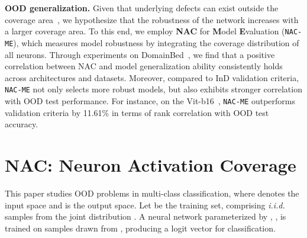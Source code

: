 \documentclass{article} \usepackage{iclr2024_conference,times}
\newcommand{\bfstart}[1]{\noindent\textbf{#1.}}
\begin{document}
\bfstart{OOD generalization} 
Given that underlying defects can exist outside the coverage area~\citep{NACT_System:DeepXplore}, we hypothesize that the robustness of the network increases with a larger coverage area.
To this end, we employ \textbf{NAC} for \textbf{M}odel \textbf{E}valuation (\texttt{NAC-ME}), which measures model robustness by integrating the coverage distribution of all neurons.
Through experiments on DomainBed~\citep{Setup:DomainBed}, we find that a positive correlation between NAC and model generalization ability consistently holds across architectures and datasets. 
Moreover, compared to InD validation criteria, \texttt{NAC-ME} not only selects more robust models, but also exhibits stronger correlation with OOD test performance.
For instance, on the Vit-b16~\citep{tech:ViT}, \texttt{NAC-ME} outperforms validation criteria by 11.61\% in terms of rank correlation with OOD test accuracy.











































































\section{NAC: Neuron Activation Coverage}
\vspace{-1mm}
\label{Sec:Method_Pre}
This paper studies OOD problems in multi-class classification, where  denotes the input space and  is the output space.
Let  be the training set, comprising \textit{i.i.d.} samples from the joint distribution . 
A neural network parameterized by , , is trained on samples drawn from , producing a logit vector for classification.
\end{document}
